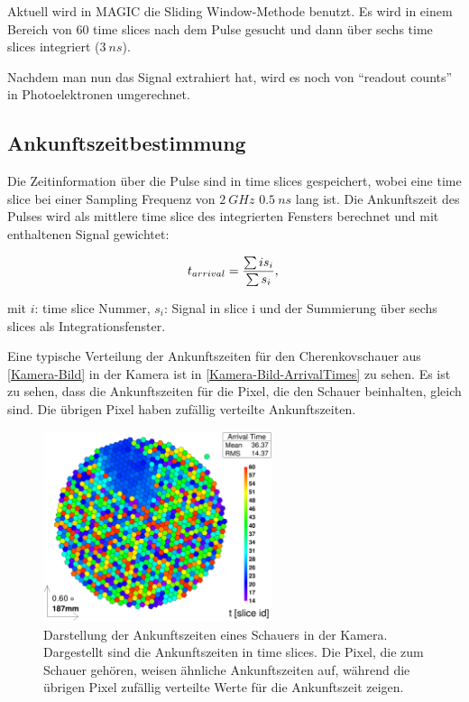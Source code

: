 Aktuell wird in MAGIC die Sliding Window-Methode benutzt. 
Es wird in einem Bereich von 60 time slices  nach dem Pulse gesucht und dann über sechs time slices integriert ($\SI{3}{ns}$).

Nachdem man nun das Signal extrahiert hat, wird es noch von ``readout counts'' in Photoelektronen umgerechnet.

\subsection{Ankunftszeitbestimmung}
Die Zeitinformation über die Pulse sind in time slices gespeichert, wobei eine time slice bei einer Sampling Frequenz von $\SI{2}{GHz}$ $\SI{0,5}{ns}$ lang ist.
Die Ankunftszeit des Pulses wird als mittlere time slice des integrierten Fensters berechnet und mit enthaltenen Signal gewichtet:

\begin{equation}
 t_{arrival}=\frac{\sum i s_i}{\sum s_i},\\
\end{equation}
\begin{center}
\small{mit $i$: time slice Nummer, $s_i$: Signal in slice i und der Summierung über sechs slices als Integrationsfenster.}
\end{center}


Eine typische Verteilung der Ankunftszeiten für den Cherenkovschauer aus \autoref{Kamera-Bild} in der Kamera ist in \autoref{Kamera-Bild-ArrivalTimes} zu sehen.
Es ist zu sehen, dass die Ankunftszeiten für die Pixel, die den Schauer beinhalten, gleich sind.
Die übrigen Pixel haben zufällig verteilte Ankunftszeiten.

\begin{figure}
    \centering
    \includegraphics[width=0.6\textwidth]{./Plots/03_MonteCarlos/Signal_ArrivalTime_fertig.png}
    \caption{Darstellung der Ankunftszeiten eines Schauers in der Kamera. Dargestellt sind die Ankunftszeiten in time slices.
    Die Pixel, die zum Schauer gehören, weisen ähnliche Ankunftszeiten auf, während die übrigen Pixel zufällig verteilte Werte für die Ankunftszeit zeigen.}
    \label{Kamera-Bild-ArrivalTimes}
\end{figure}


